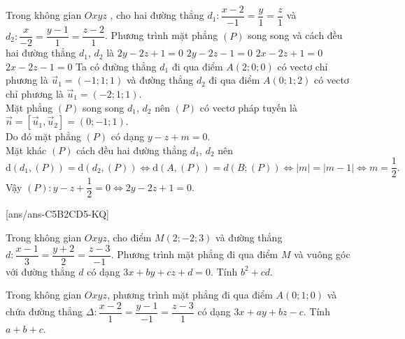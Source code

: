 \begin{ex}%
Trong không gian $Oxyz$ , cho hai đường thẳng $d_1\colon\dfrac{x-2}{-1}=\dfrac{y}{1}=\dfrac{z}{1}$ và $d_2\colon\dfrac{x}{-2}=\dfrac{y-1}{1}=\dfrac{z-2}{1}$. Phương trình mặt phẳng $(P)$ song song và cách đều hai đường thẳng $d_1$, ${d_2}$ là
\choice
{\True $ 2y-2z+1=0$}
{$ 2y-2z-1=0$}
{$2x-2z+1=0$}
{$2x-2z-1=0$}
\loigiai
{
Ta có đường thẳng $d_1$ đi qua điểm $ A(2;0;0)$ có vectơ chỉ phương là $\overrightarrow{u}_1=(-1;1;1)$ và đường thẳng $d_2$ đi qua điểm $ A(0;1;2)$ có vectơ chỉ phương là $\overrightarrow{u}_1=(-2; 1; 1)$.\\
Mặt phẳng $(P)$ song song $d_1$, ${d_2}$ nên $(P)$ có vectơ pháp tuyến là $\overrightarrow{n}=\left[\overrightarrow{u}_1,\overrightarrow{u}_2\right]=(0;-1;1)$.\\
Do đó mặt phẳng $(P)$ có dạng $ y-z+m=0$.\\
Mặt khác $(P)$ cách đều hai đường thẳng $d_1$, ${d_2}$ nên\\
$$ \mathrm{d}\left(d_1,(P)\right)=\mathrm{d}\left(d_2,(P)\right)\Leftrightarrow \mathrm{d}\left(A,(P)\right)=d\left(B;(P)\right)\Leftrightarrow\left| m\right|=\left| m-1\right|\Leftrightarrow m=\dfrac{1}{2}.$$
Vậy $(P)\colon y-z+\dfrac{1}{2}=0\Leftrightarrow 2y-2z+1=0$.}
\end{ex}
\TNSA
{}[ans/ans-C5B2CD5-KQ]
\begin{ex}%
Trong không gian $Oxyz$, cho điểm $M(2; -2; 3)$ và đường thẳng  $d\colon \dfrac{x-1}{3}=\dfrac{y+2}{2}=\dfrac{z-3}{-1}$. Phương trình mặt phẳng đi qua điểm $M$ và vuông góc với đường thẳng $d$ có dạng $3x+by+cz+d=0$. Tính $b^2+cd$.
\end{ex}

\begin{ex}%
Trong không gian $Oxyz$, phương trình mặt phẳng đi qua điểm $A(0; 1; 0)$ và chứa đường thẳng $\Delta\colon \dfrac{x-2}{1}=\dfrac{y-1}{-1}=\dfrac{z-3}{1}$ có dạng $3x+ay+bz-c$. Tính $a+b+c$.
\end{ex}


